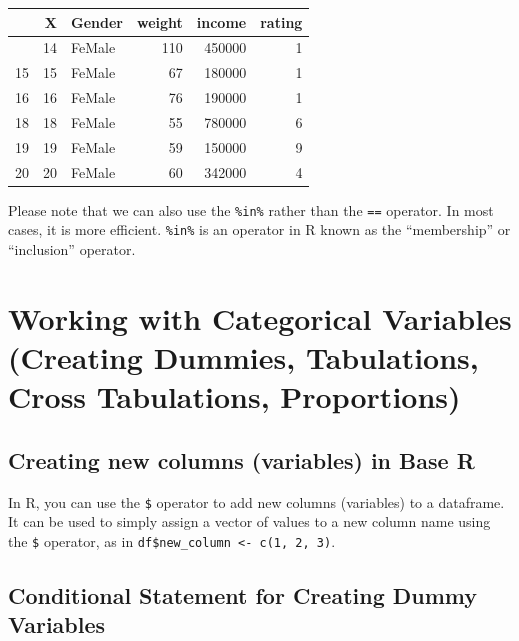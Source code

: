 \documentclass[
]{article}
\begin{document}
\begin{longtable}[]{@{}lrlrrr@{}}
\toprule\noalign{}
& X & Gender & weight & income & rating \\
\midrule\noalign{}
\endhead
\bottomrule\noalign{}
\endlastfoot
14 & 14 & FeMale & 110 & 450000 & 1 \\
15 & 15 & FeMale & 67 & 180000 & 1 \\
16 & 16 & FeMale & 76 & 190000 & 1 \\
18 & 18 & FeMale & 55 & 780000 & 6 \\
19 & 19 & FeMale & 59 & 150000 & 9 \\
20 & 20 & FeMale & 60 & 342000 & 4 \\
\end{longtable}

Please note that we can also use the \texttt{\%in\%} rather than the
\texttt{==} operator. In most cases, it is more efficient.
\texttt{\%in\%} is an operator in R known as the ``membership'' or
``inclusion'' operator.

\hypertarget{working-with-categorical-variables-creating-dummies-tabulations-cross-tabulations-proportions}{%
\section{Working with Categorical Variables (Creating Dummies,
Tabulations, Cross Tabulations,
Proportions)}\label{working-with-categorical-variables-creating-dummies-tabulations-cross-tabulations-proportions}}

\hypertarget{creating-new-columns-variables-in-base-r}{%
\subsection{Creating new columns (variables) in Base
R}\label{creating-new-columns-variables-in-base-r}}

In R, you can use the \texttt{\$} operator to add new columns
(variables) to a dataframe. It can be used to simply assign a vector of
values to a new column name using the \texttt{\$} operator, as in
\texttt{df\$new\_column\ \textless{}-\ c(1,\ 2,\ 3)}.

\hypertarget{conditional-statement-for-creating-dummy-variables}{%
\subsection{Conditional Statement for Creating Dummy
Variables}\label{conditional-statement-for-creating-dummy-variables}}
\end{document}
